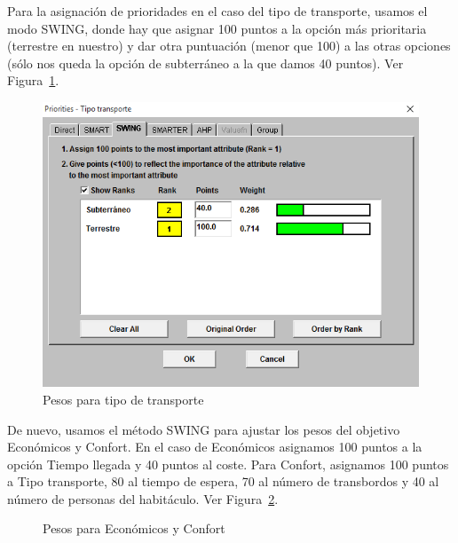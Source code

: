 \documentclass[12pt,a4paper,twoside,openright,titlepage,final]{article}
\begin{document}
Para la asignación de prioridades en el caso del tipo de transporte, usamos el modo SWING, donde hay que asignar 100 puntos a la opción más prioritaria (terrestre en nuestro) y dar otra puntuación (menor que 100) a las otras opciones (sólo nos queda la opción de subterráneo a la que damos 40 puntos). Ver Figura~\ref{fig:prioridades_tipo_transporte}.\\

\begin{figure}[htbp!]
\centering
\includegraphics[width=0.5\linewidth]{imagenes/prioridades_tipo_transporte}
\caption{Pesos para tipo de transporte} \label{fig:prioridades_tipo_transporte}
\end{figure}

De nuevo, usamos el método SWING para ajustar los pesos del objetivo Económicos y Confort. En el caso de Económicos asignamos 100 puntos a la opción Tiempo llegada y 40 puntos al coste. Para Confort, asignamos 100 puntos a Tipo transporte, 80 al tiempo de espera, 70 al número de transbordos y 40 al número de personas del habitáculo. Ver Figura~\ref{fig:swing_2}.

\begin{figure}[htbp!]
\centering
{}
\caption{Pesos para Económicos y Confort} \label{fig:swing_2}
\end{figure}
\end{document}

